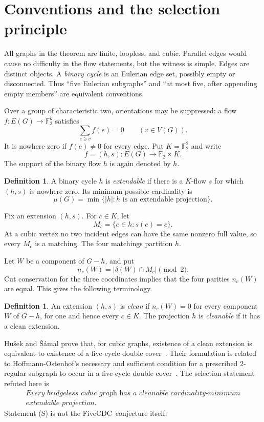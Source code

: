 \documentclass[11pt]{article}
\theoremstyle{definition}
\newtheorem{definition}[theorem]{Definition}
\theoremstyle{remark}
\newcommand{\F}{\mathbb F}
\newcommand{\FiveCDC}{\textup{FiveCDC}}
\begin{document}
\section{Conventions and the selection principle}

All graphs in the theorem are finite, loopless, and cubic.  Parallel
edges would cause no difficulty in the flow statements, but the witness
is simple.  Edges are distinct objects.  A \emph{binary cycle} is an
Eulerian edge set, possibly empty or disconnected.  Thus ``five
Eulerian subgraphs'' and ``at most five, after appending empty members''
are equivalent conventions.

Over a group of characteristic two, orientations may be suppressed:
a flow \(f:E(G)\to\F_2^k\) satisfies
\[
                    \sum_{e\ni v} f(e)=0
                    \qquad(v\in V(G)).
\]
It is nowhere zero if \(f(e)\ne0\) for every edge.  Put
\(K=\F_2^2\) and write
\[
                         f=(h,s):E(G)\longrightarrow
                         \F_2\times K.                    \tag{1}
\]
The support of the binary flow \(h\) is again denoted by \(h\).

\begin{definition}
A binary cycle \(h\) is \emph{extendable} if there is a \(K\)-flow
\(s\) for which \((h,s)\) is nowhere zero.  Its minimum possible
cardinality is
\[
        \mu(G)=\min\{|h|:h\text{ is an extendable projection}\}.
\]
\end{definition}

Fix an extension \((h,s)\).  For \(c\in K\), let
\[
                         M_c=\{e\in h:s(e)=c\}.            \tag{2}
\]
At a cubic vertex no two incident edges can have the same nonzero full
value, so every \(M_c\) is a matching.  The four matchings partition
\(h\).

Let \(W\) be a component of \(G-h\), and put
\[
       n_c(W)=|\delta(W)\cap M_c|\pmod2.
\]
Cut conservation for the three coordinates implies that the four
parities \(n_c(W)\) are equal.  This gives the following terminology.

\begin{definition}
An extension \((h,s)\) is \emph{clean} if \(n_c(W)=0\) for every
component \(W\) of \(G-h\), for one and hence every \(c\in K\).
The projection \(h\) is \emph{cleanable} if it has a clean extension.
\end{definition}

Hu\v{s}ek and \v{S}\'amal prove that, for cubic graphs, existence of a
clean extension is equivalent to existence of a five-cycle double
cover~\cite[Theorem~3.16 and Conjecture~3.19]{HusekSamal2026}.
Their formulation is related to Hoffmann-Ostenhof's necessary and
sufficient condition for a prescribed \(2\)-regular subgraph to occur
in a five-cycle double cover~\cite{HoffmannOstenhof2013}.
The selection statement refuted here is
\begin{equation}
\begin{split}
\textit{Every bridgeless cubic graph has a cleanable
cardinality-minimum}\\[-2mm]
\textit{extendable projection.}
\end{split}
\tag{S}
\end{equation}
Statement (S) is not the \FiveCDC\ conjecture itself.
\end{document}
